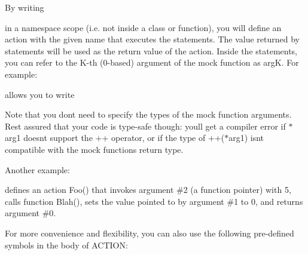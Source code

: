 By writing 
\begin{DoxyCode}{0}
\end{DoxyCode}
 in a namespace scope (i.\+e. not inside a class or function), you will define an action with the given name that executes the statements. The value returned by {\ttfamily statements} will be used as the return value of the action. Inside the statements, you can refer to the K-\/th (0-\/based) argument of the mock function as {\ttfamily argK}. For example\+: 
\begin{DoxyCode}{0}
\end{DoxyCode}
 allows you to write 
\begin{DoxyCode}{0}
\end{DoxyCode}


Note that you don\textquotesingle{}t need to specify the types of the mock function arguments. Rest assured that your code is type-\/safe though\+: you\textquotesingle{}ll get a compiler error if {\ttfamily $\ast$arg1} doesn\textquotesingle{}t support the {\ttfamily ++} operator, or if the type of {\ttfamily ++($\ast$arg1)} isn\textquotesingle{}t compatible with the mock function\textquotesingle{}s return type.

Another example\+: 
\begin{DoxyCode}{0}
\DoxyCodeLine{\}}
\end{DoxyCode}
 defines an action {\ttfamily Foo()} that invokes argument \#2 (a function pointer) with 5, calls function {\ttfamily Blah()}, sets the value pointed to by argument \#1 to 0, and returns argument \#0.

For more convenience and flexibility, you can also use the following pre-\/defined symbols in the body of {\ttfamily A\+C\+T\+I\+ON}\+:

